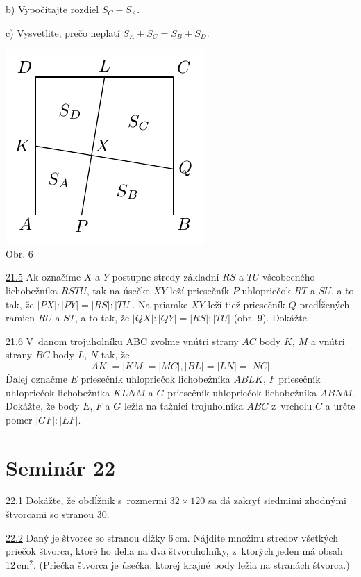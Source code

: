 b) Vypočítajte rozdiel $S_C - S_A$.

c) Vysvetlite, prečo neplatí $S_A + S_C = S_B + S_D$.
\begin{center}
\includegraphics{obrazky/60D31}\\

Obr. 6
\end{center}



\noindent \ul{21.5}  Ak označíme $X$ a $Y$ postupne stredy základní $RS$ a $TU$ všeobecného lichobežníka $RSTU$, tak na úsečke $XY$ leží priesečník $P$ uhlopriečok $RT$ a $SU$, a to tak, že $|PX| : |PY | = |RS| : |TU|$. Na priamke $XY$ leží tiež priesečník $Q$ predĺžených ramien $RU$ a $ST$, a to tak, že $|QX| : |QY | = |RS| : |TU|$ (obr. 9). Dokážte.




\noindent \ul{21.6}  V~danom trojuholníku ABC zvoľme vnútri strany $AC$ body $K$, $M$ a vnútri strany $BC$ body $L$, $N$ tak, že
$$|AK| = |KM| = |MC|, |BL| = |LN| = |NC|.$$
Ďalej označme $E$ priesečník uhlopriečok lichobežníka $ABLK$, $F$ priesečník uhlopriečok lichobežníka $KLNM$ a $G$ priesečník uhlopriečok lichobežníka $ABNM$. Dokážte, že body $E$, $F$ a $G$ ležia na ťažnici trojuholníka $ABC$ z~vrcholu $C$ a určte pomer $|GF| : |EF|$.




\section*{Seminár 22}

\noindent \ul{22.1}  Dokážte, že obdĺžnik s~rozmermi $32 \times 120$ sa dá zakryť siedmimi zhodnými štvorcami so stranou 30.




\noindent \ul{22.2}   Daný je štvorec so stranou dĺžky 6\,cm. Nájdite množinu stredov všetkých priečok štvorca, ktoré ho delia na dva štvoruholníky, z~ktorých jeden má obsah 12\,cm$^2$. (Priečka štvorca je úsečka, ktorej krajné body ležia na stranách štvorca.)




